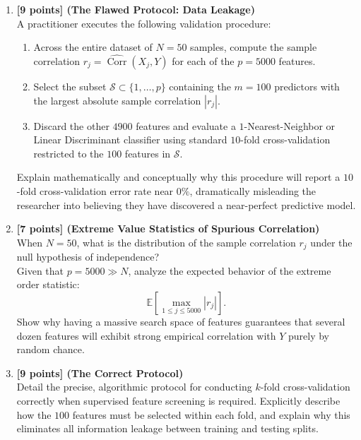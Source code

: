 \documentclass[11pt,a4paper]{article}
\begin{document}
\begin{enumerate}[label=(\alph*), itemsep=5pt, leftmargin=18pt]
  \item \textbf{[9 points] (The Flawed Protocol: Data Leakage)} \\
  A practitioner executes the following validation procedure:
  \begin{enumerate}[label=\arabic*., itemsep=2pt]
    \item Across the entire dataset of $N = 50$ samples, compute the sample correlation $r_j = \widehat{\operatorname{Corr}}(X_j, Y)$ for each of the $p = 5000$ features.
    \item Select the subset $\mathcal{S} \subset \{1, \dots, p\}$ containing the $m = 100$ predictors with the largest absolute sample correlation $|r_j|$.
    \item Discard the other $4900$ features and evaluate a $1$-Nearest-Neighbor or Linear Discriminant classifier using standard $10$-fold cross-validation restricted to the $100$ features in $\mathcal{S}$.
  \end{enumerate}
  Explain mathematically and conceptually why this procedure will report a $10$-fold cross-validation error rate near $0\%$, dramatically misleading the researcher into believing they have discovered a near-perfect predictive model.

  \item \textbf{[7 points] (Extreme Value Statistics of Spurious Correlation)} \\
  When $N = 50$, what is the distribution of the sample correlation $r_j$ under the null hypothesis of independence? \\
  Given that $p = 5000 \gg N$, analyze the expected behavior of the extreme order statistic:
  \[
    \mathbb{E}\left[ \max_{1 \le j \le 5000} |r_j| \right].
  \]
  Show why having a massive search space of features guarantees that several dozen features will exhibit strong empirical correlation with $Y$ purely by random chance.

  \item \textbf{[9 points] (The Correct Protocol)} \\
  Detail the precise, algorithmic protocol for conducting $k$-fold cross-validation correctly when supervised feature screening is required. Explicitly describe how the $100$ features must be selected within each fold, and explain why this eliminates all information leakage between training and testing splits.
\end{enumerate}
\end{document}
